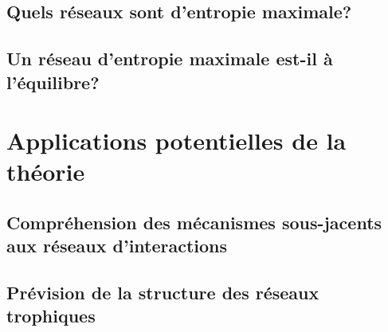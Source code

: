 \subsection{Quels réseaux sont d'entropie maximale?} 

\subsection{Un réseau d'entropie maximale est-il à l'équilibre?} 



\section{Applications potentielles de la théorie} 

\subsection{Compréhension des mécanismes sous-jacents aux réseaux d'interactions} 

\subsection{Prévision de la structure des réseaux trophiques} 

\endinput
